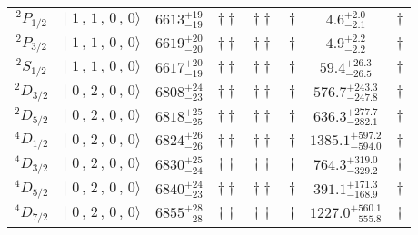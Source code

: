 \begin{tabular}{c| c c c c c c c}
$^{2}P_{1/2}$ & $\vert \,\,1\,,\,1\,,\,0\,,\,0 \rangle $ & $6613^{+19}_{-19}$ & $\dagger\dagger$ & $\dagger\dagger$ & $\dagger$ & $4.6^{+2.0}_{-2.1}$ & $\dagger$ \\ 
$^{2}P_{3/2}$ & $\vert \,\,1\,,\,1\,,\,0\,,\,0 \rangle $ & $6619^{+20}_{-20}$ & $\dagger\dagger$ & $\dagger\dagger$ & $\dagger$ & $4.9^{+2.2}_{-2.2}$ & $\dagger$ \\ 
$^{2}S_{1/2}$ & $\vert \,\,1\,,\,1\,,\,0\,,\,0 \rangle $ & $6617^{+20}_{-19}$ & $\dagger\dagger$ & $\dagger\dagger$ & $\dagger$ & $59.4^{+26.3}_{-26.5}$ & $\dagger$ \\ 
$^{2}D_{3/2}$ & $\vert \,\,0\,,\,2\,,\,0\,,\,0 \rangle $ & $6808^{+24}_{-23}$ & $\dagger\dagger$ & $\dagger\dagger$ & $\dagger$ & $576.7^{+243.3}_{-247.8}$ & $\dagger$ \\ 
$^{2}D_{5/2}$ & $\vert \,\,0\,,\,2\,,\,0\,,\,0 \rangle $ & $6818^{+25}_{-25}$ & $\dagger\dagger$ & $\dagger\dagger$ & $\dagger$ & $636.3^{+277.7}_{-282.1}$ & $\dagger$ \\ 
$^{4}D_{1/2}$ & $\vert \,\,0\,,\,2\,,\,0\,,\,0 \rangle $ & $6824^{+26}_{-26}$ & $\dagger\dagger$ & $\dagger\dagger$ & $\dagger$ & $1385.1^{+597.2}_{-594.0}$ & $\dagger$ \\ 
$^{4}D_{3/2}$ & $\vert \,\,0\,,\,2\,,\,0\,,\,0 \rangle $ & $6830^{+25}_{-24}$ & $\dagger\dagger$ & $\dagger\dagger$ & $\dagger$ & $764.3^{+319.0}_{-329.2}$ & $\dagger$ \\ 
$^{4}D_{5/2}$ & $\vert \,\,0\,,\,2\,,\,0\,,\,0 \rangle $ & $6840^{+24}_{-23}$ & $\dagger\dagger$ & $\dagger\dagger$ & $\dagger$ & $391.1^{+171.3}_{-168.9}$ & $\dagger$ \\ 
$^{4}D_{7/2}$ & $\vert \,\,0\,,\,2\,,\,0\,,\,0 \rangle $ & $6855^{+28}_{-28}$ & $\dagger\dagger$ & $\dagger\dagger$ & $\dagger$ & $1227.0^{+560.1}_{-555.8}$ & $\dagger$ \\ 
\hline \hline
\end{tabular}
